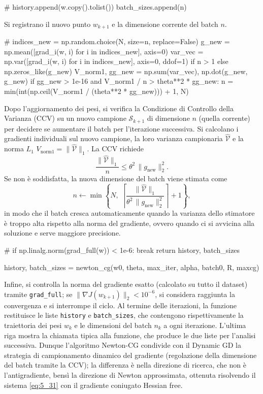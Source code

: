 \documentclass[a4paper,12pt]{article}
\numberwithin{equation}{section}
\numberwithin{figure}{section}
\numberwithin{table}{section}
\begin{document}
\begin{pythoncode}[title= Newton-CG]

#
        history.append(w.copy().tolist())
        batch_sizes.append(n)
\end{pythoncode}
Si registrano il nuovo punto \(w_{k+1}\) e la dimensione corrente del batch \(n\).
\begin{pythoncode}[title= Newton-CG]

#
        indices_new = np.random.choice(N, size=n, replace=False)
        g_new = np.mean([grad_i(w, i) for i in indices_new], axis=0)
        var_vec = np.var([grad_i(w, i) for i in indices_new], axis=0, ddof=1) if n > 1 else np.zeros_like(g_new)
        V_norm1, gg_new = np.sum(var_vec), np.dot(g_new, g_new)
        if gg_new > 1e-16 and V_norm1 / n > theta**2 * gg_new:
            n = min(int(np.ceil(V_norm1 / (theta**2 * gg_new))) + 1, N)
\end{pythoncode}
Dopo l'aggiornamento dei pesi, si verifica la Condizione di Controllo della Varianza (CCV) su un nuovo campione \(\mathcal{S}_{k+1}\) di dimensione \(n\) (quella corrente) per decidere se aumentare il batch per l'iterazione successiva. Si calcolano i gradienti individuali sul nuovo campione, la loro varianza campionaria \(\widehat{\mathcal{V}}\) e la norma \(L_1\) \(V_{\text{norm1}} = \|\widehat{\mathcal{V}}\|_1\). La CCV richiede
\[
\frac{\|\widehat{\mathcal{V}}\|_1}{n} \le \theta^2 \,\|g_{\text{new}}\|_2^2.
\]
Se non è soddisfatta, la nuova dimensione del batch viene stimata come
\[
n \leftarrow \min\left\{N,\; \left\lceil \frac{\|\widehat{\mathcal{V}}\|_1}{\theta^2\,\|g_{\text{new}}\|_2^2} \right\rceil + 1 \right\},
\]
in modo che il batch cresca automaticamente quando la varianza dello stimatore è troppo alta rispetto alla norma del gradiente, ovvero quando ci si avvicina alla soluzione e serve maggiore precisione.

\begin{pythoncode}[title= Newton-CG]

#
        if np.linalg.norm(grad_full(w)) < 1e-6:
            break
    return history, batch_sizes

history, batch_sizes = newton_cg(w0, theta, max_iter, alpha, batch0, R, maxcg)
\end{pythoncode}
Infine, si controlla la norma del gradiente esatto (calcolato su tutto il dataset) tramite \texttt{grad\_full}; se \(\|\nabla J(w_{k+1})\|_2 < 10^{-6}\), si considera raggiunta la convergenza e si interrompe il ciclo. Al termine delle iterazioni, la funzione restituisce le liste \texttt{history} e \texttt{batch\_sizes}, che contengono rispettivamente la traiettoria dei pesi \(w_k\) e le dimensioni del batch \(n_k\) a ogni iterazione. L'ultima riga mostra la chiamata tipica alla funzione, che produce le due liste per l'analisi successiva.
Dunque l'algoritmo Newton-CG condivide con il Dynamic GD la strategia di
campionamento dinamico del gradiente (regolazione della dimensione del batch
tramite la CCV); la differenza è nella direzione di ricerca, che non è
l'antigradiente, bensì la direzione di Newton approssimata, ottenuta
risolvendo il sistema \eqref{eq:5_31} con il gradiente coniugato Hessian
free.
\end{document}
